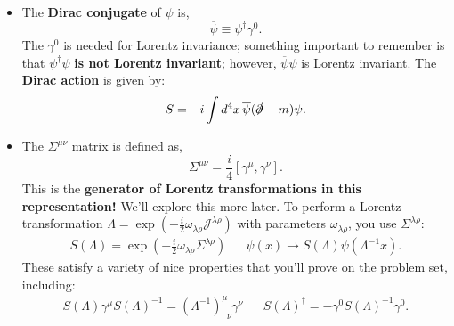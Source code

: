 \documentclass[12pt, oneside]{article}   	%
\theoremstyle{definition}
\begin{document}
\begin{itemize}
	\item The \textbf{Dirac conjugate} of $\psi$ is,
	\begin{equation}
		\overline\psi\equiv \psi^\dagger\gamma^0.
	\end{equation}
	The $\gamma^0$ is needed for Lorentz invariance; something important to remember is that $\psi^\dagger \psi$ \textbf{is not Lorentz invariant}; however, $\overline\psi \psi$ is Lorentz invariant. The \textbf{Dirac action} is given by:
	\begin{equation}
		S = -i\int d^4x\, \overline{\psi} (\slashed\partial - m)\psi.
	\end{equation}
	
	\item The $\Sigma^{\mu\nu}$ matrix is defined as,
	\begin{equation}
		\Sigma^{\mu\nu} = \frac{i}{4} [\gamma^\mu, \gamma^\nu]. \label{eq:sigma_munu}
	\end{equation}
	This is the \textbf{generator of Lorentz transformations in this representation!} We'll explore this more later. To perform a Lorentz transformation $\Lambda = \exp(-\frac{i}{2} \omega_{\lambda\rho} \mathcal J^{\lambda\rho})$ with parameters $\omega_{\lambda\rho}$, you use $\Sigma^{\lambda\rho}$:
	\begin{align}
		S(\Lambda) = \exp\left(-\frac{i}{2} \omega_{\lambda\rho} \Sigma^{\lambda\rho}\right) && \psi(x)\longrightarrow S(\Lambda) \psi(\Lambda^{-1} x).
	\end{align}
	These satisfy a variety of nice properties that you'll prove on the problem set, including:
	\begin{align}
		S(\Lambda) \gamma^\mu S(\Lambda)^{-1} = (\Lambda^{-1})^\mu_{\;\;\nu} \gamma^\nu && S(\Lambda)^\dagger = -\gamma^0 S(\Lambda)^{-1} \gamma^0.
	\end{align}


\end{itemize}
\end{document}
